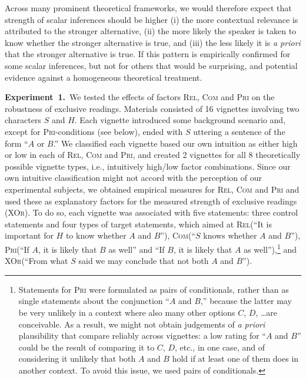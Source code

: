 \documentclass[12pt]{article}
\newcommand{\acro}[1]{\textsc{#1}\xspace}
\newcommand{\rel}{\acro{Rel}}
\newcommand{\com}{\acro{Com}}
\newcommand{\pri}{\acro{Pri}}
\newcommand{\xor}{\acro{XOr}}
\begin{document}
Across many prominent theoretical frameworks, we would therefore expect that strength of scalar
inferences should be higher (i) the more contextual relevance is attributed to the stronger
alternative, (ii) the more likely the speaker is taken to know whether the stronger alternative
is true, and (iii) the less likely it is \emph{a priori} that the stronger alternative is
true. If this pattern is empirically confirmed for some scalar inferences, but not for others
that would be surprising, and potential evidence against a homogeneous theoretical treatment.


\medskip

\noindent \textbf{Experiment~1.}\ We tested the effects of factors \rel, \com and \pri on the
robustness of exclusive readings. Materials consisted of 16 vignettes involving two characters
$S$ and $H$. Each vignette introduced some background scenario and, except for \pri-conditions
(see below), ended with $S$ uttering a sentence of the form ``$A$ or $B$.'' We classified each
vignette based our own intuition as either high or low in each of \rel, \com and \pri, and
created 2 vignettes for all 8 theoretically possible vignette types, i.e., intuitively high/low
factor combinations. Since our own intuitive classification might not accord with the
perception of our experimental subjects, we obtained empirical measures for \rel, \com and \pri
and used these as explanatory factors for the measured strength of exclusive readings
(\xor). To do so, each vignette was associated with five statements: three control statements
and four types of target statements, which aimed at \rel (``It is important for $H$ to know
whether $A$ and $B$''), \com (``$S$ knows whether $A$ and $B$''), \pri (``If $A$, it is likely
that $B$ as well'' and ``If $B$, it is likely that $A$ as well''),\footnote{Statements for \pri
  were formulated as pairs of conditionals, rather than as single statements about the
  conjunction ``$A$ and $B$,'' because the latter may be very unlikely in a context where also
  many other options $C$, $D$, \dots are conceivable.  As a result, we might not obtain
  judgements of \emph{a priori} plausibility that compare reliably across vignettes: a low
  rating for ``$A$ and $B$'' could be the result of comparing it to $C$, $D$, etc., in one
  case, and of considering it unlikely that both $A$ and $B$ hold if at least one of them does
  in another context. To avoid this issue, we used pairs of conditionals.} and \xor (``From
what $S$ said we may conclude that not both $A$ and $B$'').
\end{document}
